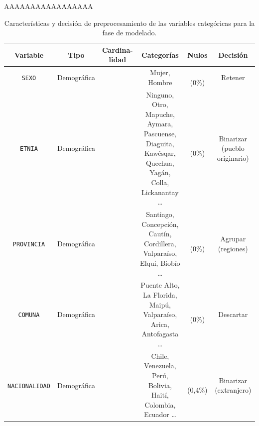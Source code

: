 AAAAAAAAAAAAAAAAA
\begin{table}[htbp]
\centering
\scriptsize
\setlength{\tabcolsep}{4pt}
\renewcommand{\arraystretch}{1.4}
\caption{Características y decisión de preprocesamiento de las variables categóricas para la fase de modelado.}
\begin{tabular}{|c|c|c|c|c|c|}
\hline
\parbox[t]{2.6cm}{\centering\textbf{Variable}} &
\parbox[t]{1.5cm}{\centering\textbf{Tipo}} &
\parbox[t]{1cm}{\centering\textbf{Cardina-\\lidad}} &
\parbox[t]{4.4cm}{\centering\textbf{Categorías}} &
\parbox[t]{1.4cm}{\centering\textbf{Nulos}} &
\parbox[t]{3cm}{\centering\textbf{Decisión}} \\ \hline

\parbox[t]{2.6cm}{\raggedright \texttt{SEXO}} &
\parbox[t]{1.5cm}{\centering Demográfica} &
\parbox[t]{1cm}{} &
\parbox[t]{4.4cm}{\raggedright Mujer, Hombre} &
\parbox[t]{1.4cm}{\\(0\%)} &
\parbox[t]{3cm}{\raggedright Retener} \\ \hline

\parbox[t]{2.6cm}{\raggedright \texttt{ETNIA}} &
\parbox[t]{1.5cm}{\centering Demográfica} &
\parbox[t]{1cm}{} &
\parbox[t]{4.4cm}{\raggedright Ninguno, Otro, Mapuche, Aymara, Pascuense, Diaguita, Kawésqar, Quechua, Yagán, Colla, Lickanantay \ldots} &
\parbox[t]{1.4cm}{\\(0\%)} &
\parbox[t]{3cm}{\raggedright Binarizar (pueblo originario)} \\ \hline

\parbox[t]{2.6cm}{\raggedright \texttt{PROVINCIA}} &
\parbox[t]{1.5cm}{\centering Demográfica} &
\parbox[t]{1cm}{} &
\parbox[t]{4.4cm}{\raggedright Santiago, Concepción, Cautín, Cordillera, Valparaíso, Elqui, Biobío \ldots} &
\parbox[t]{1.4cm}{\\(0\%)} &
\parbox[t]{3cm}{\raggedright Agrupar (regiones)} \\ \hline

\parbox[t]{2.6cm}{\raggedright \texttt{COMUNA}} &
\parbox[t]{1.5cm}{\centering Demográfica} &
\parbox[t]{1cm}{} &
\parbox[t]{4.4cm}{\raggedright Puente Alto, La Florida, Maipú, Valparaíso, Arica, Antofagasta \ldots} &
\parbox[t]{1.4cm}{\\(0\%)} &
\parbox[t]{3cm}{\raggedright Descartar} \\ \hline

\parbox[t]{2.6cm}{\raggedright \texttt{NACIONALIDAD}} &
\parbox[t]{1.5cm}{\centering Demográfica} &
\parbox[t]{1cm}{} &
\parbox[t]{4.4cm}{\raggedright Chile, Venezuela, Perú, Bolivia, Haití, Colombia, Ecuador \ldots} &
\parbox[t]{1.4cm}{\\(0,4\%)} &
\parbox[t]{3cm}{\raggedright Binarizar (extranjero)} \\ \hline


\end{tabular}
\end{table}
